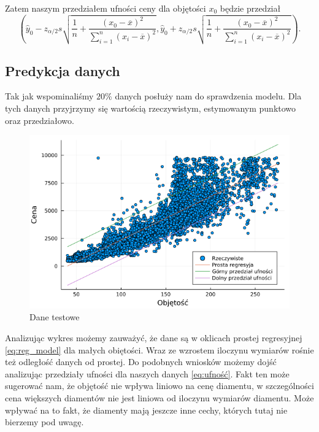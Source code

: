 \documentclass[12pt,leqno]{article}
\theoremstyle{exer}
\begin{document}
	Zatem naszym przedziałem ufności ceny dla objętości $x_0$ będzie przedział
	\begin{equation}\label{eq:ufność}
		\left(\hat y_0 - 	z_{\alpha/2}s\sqrt{\frac{1}{n}+\frac{\left(x_0-\overline{x}\right)^2}{\sum_{i=1}^n\left(x_i-\overline{x}\right)^2}}, \hat y_0 + z_{\alpha/2}s\sqrt{\frac{1}{n}+\frac{\left(x_0-\overline{x}\right)^2}{\sum_{i=1}^n\left(x_i-\overline{x}\right)^2}}\right).
	\end{equation}
     
     \subsection{Predykcja danych}
     Tak jak wspominaliśmy $ 20\% $ danych posłuży nam do sprawdzenia modelu. Dla tych danych przyjrzymy się wartością rzeczywistym, estymowanym punktowo oraz przedziałowo.
     
     
	\begin{figure}[H]
	\centering
	\includegraphics[width=4\columnwidth/5]{images/prediction.png}
	\caption{Dane testowe}
	\label{fig:prediction}
\end{figure}
Analizując wykres możemy zauważyć, że dane są w oklicach prostej regresyjnej \ref{eq:reg_model} dla małych obiętości. Wraz ze wzrostem iloczynu wymiarów rośnie też odległość danych od prostej. Do podobnych wniosków możemy dojść analizując przedziały ufności dla naszych danych \ref{eq:ufność}. Fakt ten może sugerować nam, że objętość nie wpływa liniowo na cenę diamentu, w szczególności cena większych diamentów  nie jest liniowa od iloczynu wymiarów diamentu. Może wpływać na to fakt, że diamenty mają jeszcze inne cechy, których tutaj nie bierzemy pod uwagę. 
\end{document}
